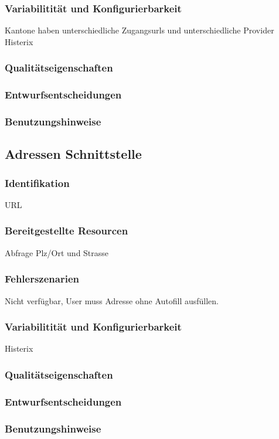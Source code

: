 \subsubsection{Variabilitität und Konfigurierbarkeit}
Kantone haben unterschiedliche Zugangsurls und unterschiedliche Provider
Histerix

\subsubsection{Qualitätseigenschaften}

\subsubsection{Entwurfsentscheidungen} 

\subsubsection{Benutzungshinweise} 

\subsection{Adressen Schnittstelle}

\subsubsection{Identifikation}
URL

\subsubsection{Bereitgestellte Resourcen}
Abfrage Plz/Ort und Strasse

\subsubsection{Fehlerszenarien}
Nicht verfügbar, User muss Adresse ohne Autofill ausfüllen.

\subsubsection{Variabilitität und Konfigurierbarkeit}
Histerix

\subsubsection{Qualitätseigenschaften}

\subsubsection{Entwurfsentscheidungen} 

\subsubsection{Benutzungshinweise} 



